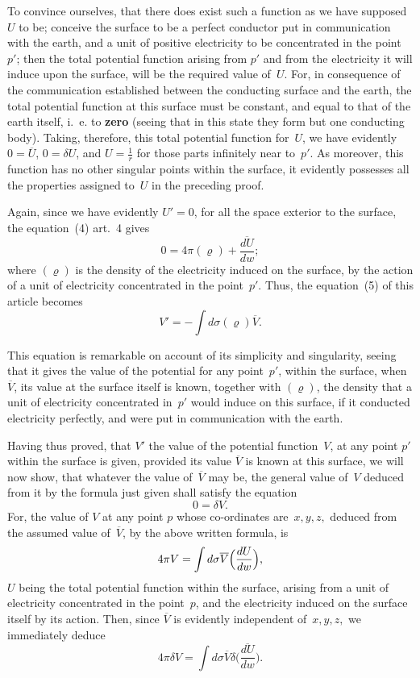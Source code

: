 \documentclass[12pt,notitlepage]{amsart}
\let\Emphasis\textbf
\renewcommand{\rho}{\varrho}
\begin{document}
To convince ourselves, that there does exist such a function as we
have supposed $U$ to be; conceive the surface to be a perfect conductor put
in communication with the earth, and a unit of positive electricity to be 
concentrated in the point $p'$;
then the total potential function arising from $p'$ and
from the electricity it will induce upon the surface, will be the required value
of~$U$. For, in consequence of the communication established between the
conducting surface and the earth, the total potential function at this surface
must be constant, and equal to that of the earth itself,
i.~e. to \Emphasis{zero} (seeing
that in this state they form but one conducting body). Taking, therefore,
this total potential function for~$U$,
we have evidently~$0=\overline{U}$, $0=\delta U$, and
$U=\frac1r$ for those parts infinitely near to~$p'$.
As moreover, this function has
no other singular points within the surface, it evidently possesses all the 
properties assigned to~$U$ in the preceding proof.

Again, since we have evidently $U'=0$, for all the space exterior
to the surface, the equation~(4) art.~4 gives
\[
0=4\pi(\rho)+\frac{\overline{dU}}{dw};
\]
where $(\rho)$ is the density
of the electricity induced on the surface, by the
action of a unit of electricity concentrated in the point~$p'$.
Thus, the equation~(5) of this article becomes
\[
\tag{6.}
V'=-\int d\sigma(\rho)\overline{V}.
\]

This equation is remarkable on account of its simplicity and singularity,
seeing that it gives the value of the potential for any point~$p'$, within the
surface, when $\overline{V}$, its value
at the surface itself is known, together with $(\rho)$,
the density that a unit of electricity concentrated in~$p'$ would induce on this
surface, if it conducted electricity perfectly, and were put in communication
with the earth.

Having thus proved, that $V'$ the value of the potential function~$V$, at
any point $p'$ within the surface is given,
provided its value $\overline{V}$ is known at
this surface, we will now show,
that whatever the value of~$\overline{V}$ may be, the
general value of~$V$ deduced from it by the formula just given shall satisfy
the equation
\[
0 = \delta V.
\]
For, the value of $V$ at any point $p$ whose co-ordinates are~$x,y,z,$ deduced
from the assumed value of~$\overline{V}$, by the above written formula, is
\[
4\pi V=\int d\sigma\overline{V}
\Bigl(\frac{dU}{dw}\Bigr),
\]
$U$ being the total potential function within the surface,
arising from a unit of
electricity concentrated in the point~$p$,
and the electricity induced on the surface
itself by its action.
Then, since $\overline{V}$ is evidently independent of~$x,y,z,$ we
immediately deduce
\[
4\pi\delta V=\int d\sigma\overline{V}\delta
\biggl(\frac{\overline{dU}}{dw}\biggr).
\]
\end{document}
